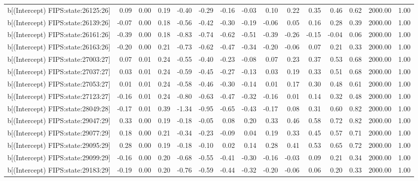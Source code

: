 \begin{table}[ht]
\begin{tabular}{rrrrrrrrrrrrrrr}
  b[(Intercept) FIPS:state:26125:26] & 0.09 & 0.00 & 0.19 & -0.40 & -0.29 & -0.16 & -0.03 & 0.10 & 0.22 & 0.35 & 0.46 & 0.62 & 2000.00 & 1.00 \\ 
  b[(Intercept) FIPS:state:26139:26] & -0.07 & 0.00 & 0.18 & -0.56 & -0.42 & -0.30 & -0.19 & -0.06 & 0.05 & 0.16 & 0.28 & 0.39 & 2000.00 & 1.00 \\ 
  b[(Intercept) FIPS:state:26161:26] & -0.39 & 0.00 & 0.18 & -0.83 & -0.74 & -0.62 & -0.51 & -0.39 & -0.26 & -0.15 & -0.04 & 0.06 & 2000.00 & 1.00 \\ 
  b[(Intercept) FIPS:state:26163:26] & -0.20 & 0.00 & 0.21 & -0.73 & -0.62 & -0.47 & -0.34 & -0.20 & -0.06 & 0.07 & 0.21 & 0.33 & 2000.00 & 1.00 \\ 
  b[(Intercept) FIPS:state:27003:27] & 0.07 & 0.01 & 0.24 & -0.55 & -0.40 & -0.23 & -0.08 & 0.07 & 0.23 & 0.37 & 0.53 & 0.68 & 2000.00 & 1.00 \\ 
  b[(Intercept) FIPS:state:27037:27] & 0.03 & 0.01 & 0.24 & -0.59 & -0.45 & -0.27 & -0.13 & 0.03 & 0.19 & 0.33 & 0.51 & 0.68 & 2000.00 & 1.00 \\ 
  b[(Intercept) FIPS:state:27053:27] & 0.01 & 0.01 & 0.24 & -0.58 & -0.46 & -0.30 & -0.14 & 0.01 & 0.17 & 0.30 & 0.48 & 0.61 & 2000.00 & 1.00 \\ 
  b[(Intercept) FIPS:state:27123:27] & -0.16 & 0.01 & 0.24 & -0.80 & -0.63 & -0.47 & -0.32 & -0.16 & 0.01 & 0.14 & 0.32 & 0.48 & 2000.00 & 1.00 \\ 
  b[(Intercept) FIPS:state:28049:28] & -0.17 & 0.01 & 0.39 & -1.34 & -0.95 & -0.65 & -0.43 & -0.17 & 0.08 & 0.31 & 0.60 & 0.82 & 2000.00 & 1.00 \\ 
  b[(Intercept) FIPS:state:29047:29] & 0.33 & 0.00 & 0.19 & -0.18 & -0.05 & 0.08 & 0.20 & 0.33 & 0.46 & 0.58 & 0.72 & 0.82 & 2000.00 & 1.00 \\ 
  b[(Intercept) FIPS:state:29077:29] & 0.18 & 0.00 & 0.21 & -0.34 & -0.23 & -0.09 & 0.04 & 0.19 & 0.33 & 0.45 & 0.57 & 0.71 & 2000.00 & 1.00 \\ 
  b[(Intercept) FIPS:state:29095:29] & 0.28 & 0.00 & 0.19 & -0.18 & -0.10 & 0.02 & 0.14 & 0.28 & 0.41 & 0.53 & 0.65 & 0.72 & 2000.00 & 1.00 \\ 
  b[(Intercept) FIPS:state:29099:29] & -0.16 & 0.00 & 0.20 & -0.68 & -0.55 & -0.41 & -0.30 & -0.16 & -0.03 & 0.09 & 0.21 & 0.34 & 2000.00 & 1.00 \\ 
  b[(Intercept) FIPS:state:29183:29] & -0.19 & 0.00 & 0.20 & -0.76 & -0.59 & -0.44 & -0.32 & -0.20 & -0.06 & 0.06 & 0.20 & 0.33 & 2000.00 & 1.00 \\ 

\end{tabular}
\end{table}
